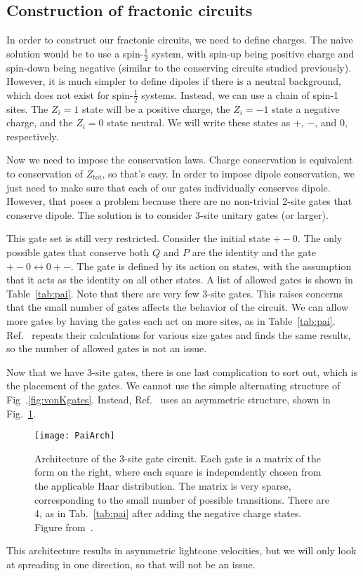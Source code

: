 \documentclass[a4paper,11pt]{article}
\renewcommand{\th}[1]{\frac{1}{#1}}
\begin{document}
\subsection{Construction of fractonic circuits} \label{sub:construct}

In order to construct our fractonic circuits, we need to define charges. The naive solution would be to use a spin-$\th{2}$ system, with spin-up being positive charge and spin-down being negative (similar to the conserving circuits studied previously). However, it is much simpler to define dipoles if there is a neutral background, which does not exist for spin-$\th{2}$ systems. Instead, we can use a chain of spin-1 sites. The $Z_i=1$ state will be a positive charge, the $Z_i=-1$ state a negative charge, and the $Z_i=0$ state neutral. We will write these states as +, $-$, and 0, respectively.

Now we need to impose the conservation laws. Charge conservation is equivalent to conservation of $Z_\text{tot}$, so that's easy. In order to impose dipole conservation, we just need to make sure that each of our gates individually conserves dipole. However, that poses a problem because there are no non-trivial 2-site gates that conserve dipole. The solution is to consider 3-site unitary gates (or larger).

This gate set is still very restricted. Consider the initial state $+-0$. The only possible gates that conserve both $Q$ and $P$ are the identity and the gate $+-0\leftrightarrow 0+-$. The gate is defined by its action on states, with the assumption that it acts as the identity on all other states. A list of allowed gates is shown in Table~\ref{tab:pai}. Note that there are very few 3-site gates. This raises concerns that the small number of gates affects the behavior of the circuit. We can allow more gates by having the gates each act on more sites, as in Table~\ref{tab:pai}. Ref.~\cite{PaiFracton} repeats their calculations for various size gates and finds the same results, so the number of allowed gates is not an issue.


Now that we have 3-site gates, there is one last complication to sort out, which is the placement of the gates. We cannot use the simple alternating structure of Fig~.\ref{fig:vonKgates}. Instead, Ref.~\cite{PaiFracton} uses an asymmetric structure, shown in Fig.~\ref{fig:PaiArch}.
\begin{figure}
	\centering
	\texttt{[image: PaiArch]}
	\caption{Architecture of the 3-site gate circuit. Each gate is a matrix of the form on the right, where each square is independently chosen from the applicable Haar distribution. The matrix is very sparse, corresponding to the small number of possible transitions. There are 4, as in Tab.~\ref{tab:pai} after adding the negative charge states. Figure from~\cite{PaiFracton}.}
	\label{fig:PaiArch}
\end{figure}
This architecture results in asymmetric lightcone velocities, but we will only look at spreading in one direction, so that will not be an issue.
\end{document}
